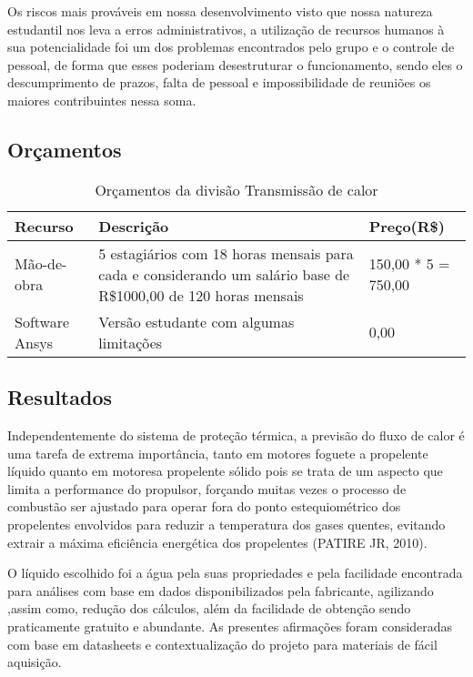 Os riscos mais prováveis em nossa desenvolvimento visto que nossa natureza estudantil nos leva a erros administrativos, a utilização de recursos humanos à sua potencialidade foi um dos problemas encontrados pelo grupo e o controle de pessoal, de forma que esses poderiam desestruturar o funcionamento, sendo eles o descumprimento de prazos, falta de pessoal e impossibilidade de reuniões os maiores contribuintes nessa soma.

\subsection {Orçamentos}

\begin{table}[htb]
\begin{tabular}{|p{3cm}|p{4cm}|p{3cm}|}
\hline
Recurso & Descrição & Preço(R\$) \\
\hline
Mão-de-obra & 5 estagiários com 18 horas mensais para cada e considerando um salário base de R\$1000,00 de 120 horas mensais & 150,00 * 5 = 750,00\\ \hline
Software Ansys & Versão estudante com algumas limitações & 0,00\\ \hline
\hline
\end{tabular}
\caption{Orçamentos da divisão Transmissão de calor}
\end{table}

\subsection{Resultados}

Independentemente do sistema de proteção térmica, a previsão do fluxo de calor é uma tarefa de extrema importância, tanto em motores foguete a propelente líquido quanto em motoresa propelente sólido pois se trata de um aspecto que limita a performance do propulsor, forçando muitas vezes o processo de combustão ser ajustado para operar fora do ponto estequiométrico dos propelentes envolvidos para reduzir a temperatura dos gases quentes, evitando extrair a máxima eficiência energética dos propelentes (PATIRE JR, 2010).

O líquido escolhido foi a água pela suas propriedades e pela facilidade encontrada para análises com base em dados disponibilizados pela fabricante, agilizando ,assim como, redução dos cálculos, além da facilidade de obtenção sendo praticamente gratuito e abundante. As presentes afirmações foram consideradas com base em datasheets e contextualização do projeto para materiais de fácil aquisição.

